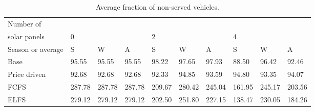 \begin{table}[h]
\centering
\begin{tabular}{l|lll|lll|lll}Number of \\ solar panels&0& & &2& & &4& & \\ \hline
Season or average & S & W & A & S & W & A & S & W & A \\ \hline
Base&95.55&95.55&95.55&98.22&97.65&97.93&88.50&96.42&92.46 \\
Price driven&92.68&92.68&92.68&92.33&94.85&93.59&94.80&93.35&94.07 \\
FCFS&287.78&287.78&287.78&209.67&280.42&245.04&161.95&245.17&203.56 \\
ELFS&279.12&279.12&279.12&202.50&251.80&227.15&138.47&230.05&184.26 \\
\end{tabular}
\caption{Average fraction of non-served vehicles.}
\label{avg non served}
\end{table}
